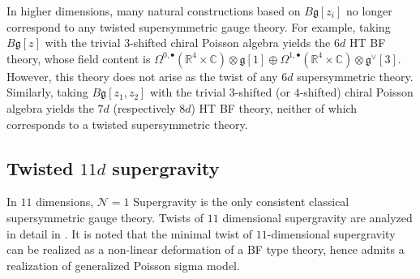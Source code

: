 \documentclass[11pt]{article}
\newcommand{\C}{\mathbb{C}}
\newcommand{\R}{\mathbb{R}}
\numberwithin{equation}{section}
\begin{document}
In higher dimensions, many natural constructions based on $B\mathfrak{g}[z_i]$ no longer correspond to any twisted supersymmetric gauge theory. For example, taking $B\mathfrak{g}[z]$ with the trivial $3$-shifted chiral Poisson algebra yields the $6d$ HT BF theory, whose field content is $\Omega^{0,\bullet}(\R^4\times\C)\otimes \mathfrak{g}[1]\oplus \Omega^{1,\bullet}(\R^4\times\C)\otimes \mathfrak{g}^{\vee}[3]$. However, this theory does not arise as the twist of any $6d$ supersymmetric theory. Similarly, taking $B\mathfrak{g}[z_1,z_2]$ with the trivial $3$-shifted (or $4$-shifted) chiral Poisson algebra yields the $7d$ (respectively $8d$) HT BF theory, neither of which corresponds to a twisted supersymmetric theory.


\subsection{Twisted $11d$ supergravity}
In $11$ dimensions, $\mathcal{N}=1$ Supergravity is the only consistent classical supersymmetric gauge theory. Twists of $11$ dimensional supergravity are analyzed in detail in \cite{raghavendran2023twisted}. It is noted that the minimal twist of $11$-dimensional supergravity can be realized as a non-linear deformation of a BF type theory, hence admits a realization of generalized Poisson sigma model. 
\end{document}

